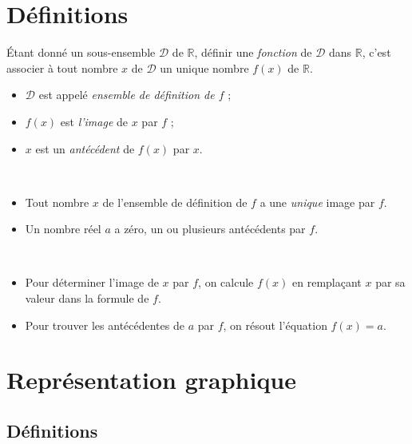 \section{Définitions}

\begin{definition}
  Étant donné un sous-ensemble $\mathcal{D}$ de $\mathbb{R}$, définir une \emph{fonction} de $\mathcal{D}$ dans $\mathbb{R}$, c'est associer à tout nombre $x$ de $\mathcal{D}$ un unique nombre $f(x)$ de $\mathbb{R}$.

  \begin{itemize}[$\bullet$]
    \item $\mathcal{D}$ est appelé \emph{ensemble de définition de $f$} ;
    \item $f(x)$ est \emph{l'image} de $x$ par $f$ ;
    \item $x$ est un \emph{antécédent} de $f(x)$ par $x$.
  \end{itemize}
\end{definition}

\begin{remarque}~
  \begin{itemize}
    \item Tout nombre $x$ de l'ensemble de définition de $f$ a une \emph{unique} image par $f$.
    \item Un nombre réel $a$ a zéro, un ou plusieurs antécédents par $f$.
  \end{itemize}
\end{remarque}

\begin{methode}~
  \begin{itemize}
    \item Pour déterminer l'image de $x$ par $f$, on calcule $f(x)$ en remplaçant $x$ par sa valeur dans la formule de $f$.
    \item Pour trouver les antécédentes de $a$ par $f$, on résout l'équation $f(x)=a$.
  \end{itemize}
\end{methode}

\section{Représentation graphique}

\subsection{Définitions}

